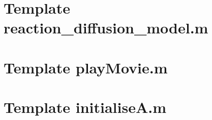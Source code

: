 \lstset{
tabsize=2,
showspaces=false,
basicstyle=\scriptsize
}
\section{Template reaction\_diffusion\_model.m}
\label{reactiondiffusionmodel}

\section{Template playMovie.m}
\label{playmovie}

\section{Template initialiseA.m}
\label{initialisea}

